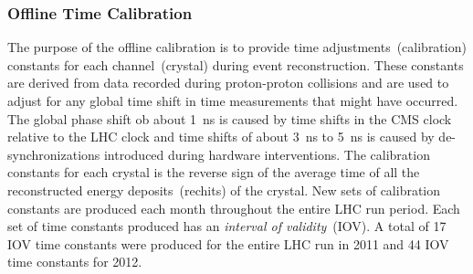 \subsubsection{Offline Time Calibration}
The purpose of the offline calibration is to provide time adjustments~(calibration) constants for each channel~(crystal) during event reconstruction. These constants are derived from data recorded during  proton-proton collisions and are used to adjust for any global time shift in time measurements that might have occurred. The global phase shift ob about 1~ns is caused by time shifts in the CMS clock relative to the LHC clock and time shifts of about 3~ns to 5~ns is caused by de-synchronizations introduced during hardware interventions.
The calibration constants for each crystal is the reverse sign of the average time of all the reconstructed energy deposits~(rechits) of the crystal.
New sets of calibration constants are produced each month throughout the entire LHC run period.
Each set of time constants produced has an \textit{interval of validity}~(IOV).
A total of 17 IOV time constants were produced for the entire LHC run in 2011 and 44 IOV time constants for 2012.
